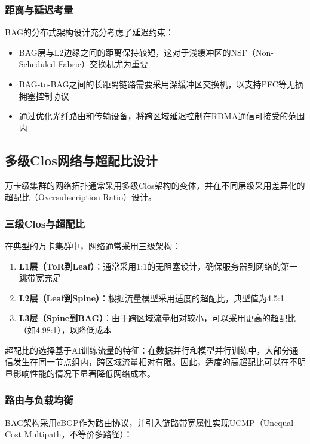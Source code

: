 \subsubsection{距离与延迟考量}

BAG的分布式架构设计充分考虑了延迟约束：

\begin{itemize}
    \item BAG层与L2边缘之间的距离保持较短，这对于浅缓冲区的NSF（Non-Scheduled Fabric）交换机尤为重要
    \item BAG-to-BAG之间的长距离链路需要采用深缓冲区交换机，以支持PFC等无损拥塞控制协议
    \item 通过优化光纤路由和传输设备，将跨区域延迟控制在RDMA通信可接受的范围内
\end{itemize}

\subsection{多级Clos网络与超配比设计}

万卡级集群的网络拓扑通常采用多级Clos架构的变体，并在不同层级采用差异化的超配比（Oversubscription Ratio）设计。

\subsubsection{三级Clos与超配比}

在典型的万卡集群中，网络通常采用三级架构：

\begin{enumerate}
    \item \textbf{L1层（ToR到Leaf）}：通常采用1:1的无阻塞设计，确保服务器到网络的第一跳带宽充足
    \item \textbf{L2层（Leaf到Spine）}：根据流量模型采用适度的超配比，典型值为4.5:1
    \item \textbf{L3层（Spine到BAG）}：由于跨区域流量相对较小，可以采用更高的超配比（如4.98:1），以降低成本
\end{enumerate}

超配比的选择基于AI训练流量的特征：在数据并行和模型并行训练中，大部分通信发生在同一节点组内，跨区域流量相对有限。因此，适度的高超配比可以在不明显影响性能的情况下显著降低网络成本。

\subsubsection{路由与负载均衡}

BAG架构采用eBGP作为路由协议，并引入链路带宽属性实现UCMP（Unequal Cost Multipath，不等价多路径）：

